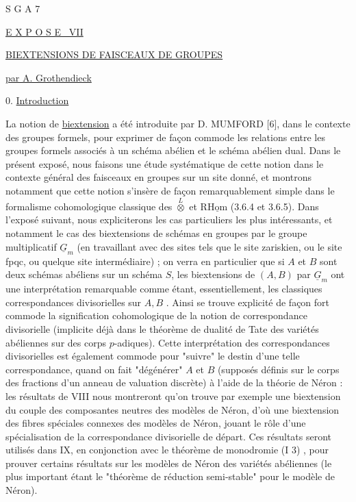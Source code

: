 


S G A 7


\underline{E X P O S E \ VII}


\underline{\underline{BIEXTENSIONS DE FAISCEAUX DE GROUPES}}


\underline{par A. Grothendieck}


0. \underline{Introduction}

La notion de \underline{biextension} a été introduite par D. MUMFORD [6], dans le contexte des groupes formels, pour exprimer de façon commode les relations entre les groupes formels associés à un schéma abélien et le schéma abélien dual. Dans le présent exposé, nous faisons une étude systématique de cette notion dans le contexte général des faisceaux en groupes sur un site donné, et montrons notamment que cette notion s'insère de façon remarquablement simple dans le formalisme cohomologique classique des $\overset{L}{\otimes}$ et $\mathrm{R}\underline{\mathrm{Hom}}$ (3.6.4 et 3.6.5). Dans l'exposé suivant, nous expliciterons les cas particuliers les plus intéressants, et notamment le cas des biextensions de schémas en groupes par le groupe multiplicatif $\underline{G}_{m}$ (en travaillant avec des sites tels que le site zariskien, ou le site fpqc, ou quelque site intermédiaire) ; on   verra en particulier que si $A$ et $B$ sont deux schémas abéliens sur un schéma $S$, les biextensions de $(A,B)$ par $\underline{G}_{m}$ ont une interprétation remarquable comme étant, essentiellement, les classiques correspondances divisorielles sur $A,B$ . Ainsi se trouve explicité de façon fort commode la signification cohomologique de la notion de correspondance divisorielle (implicite déjà dans le théorème de dualité de Tate des variétés abéliennes sur des corps $p$-adiques). Cette interprétation des correspondances divisorielles est également commode pour "suivre" le destin d'une telle correspondance, quand on fait "dégénérer"
$A$ et $B$ (supposés définis sur le corps des fractions d'un anneau de valuation discrète) à l'aide de la théorie de Néron : les résultats de VIII nous montreront qu'on trouve par exemple une biextension du couple des composantes neutres des modèles de Néron, d'où une biextension des fibres spéciales connexes des modèles de Néron, jouant le rôle d'une spécialisation de la correspondance divisorielle de départ. Ces résultats seront utilisés dans IX, en conjonction avec le théorème de monodromie (I 3) , pour prouver certains résultats sur les modèles de Néron des variétés abéliennes  (le plus important étant le "théorème de réduction semi-stable" pour le modèle de Néron).


